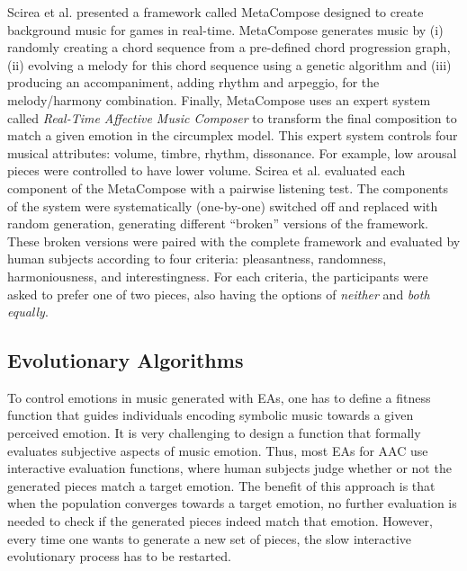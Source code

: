 Scirea et al. \cite{scirea2017affective} presented a framework called MetaCompose designed to create background music for games in real-time. MetaCompose generates music by (i) randomly creating a chord sequence from a pre-defined chord progression graph, (ii) evolving a melody for this chord sequence using a genetic algorithm and (iii) producing an accompaniment, adding rhythm and arpeggio, for the melody/harmony combination. Finally, MetaCompose uses an expert system called \textit{Real-Time Affective Music Composer} to transform the final composition to match a given emotion in the circumplex model. This expert system controls four musical attributes: volume, timbre, rhythm, dissonance. For example, low arousal pieces were controlled to have lower volume. Scirea et al. \cite{scirea2017affective} evaluated each component of the MetaCompose with a pairwise listening test. The components of the system were systematically (one-by-one) switched off and replaced with random generation, generating different ``broken'' versions of the framework. These broken versions were paired with the complete framework and evaluated by human subjects according to four criteria: pleasantness, randomness, harmoniousness, and interestingness. For each criteria, the participants were asked to prefer one of two pieces, also having the options of \textit{neither} and \textit{both equally}.

\subsection{Evolutionary Algorithms}

To control emotions in music generated with EAs, one has to define a fitness function that guides individuals encoding symbolic music towards a given perceived emotion. It is very challenging to design a function that formally evaluates subjective aspects of music emotion. Thus, most EAs for AAC use interactive evaluation functions, where human subjects judge whether or not the generated pieces match a target emotion. The benefit of this approach is that when the population converges towards a target emotion, no further evaluation is needed to check if the generated pieces indeed match that emotion.
However, every time one wants to generate a new set of pieces, the slow interactive evolutionary process
has to be restarted.

